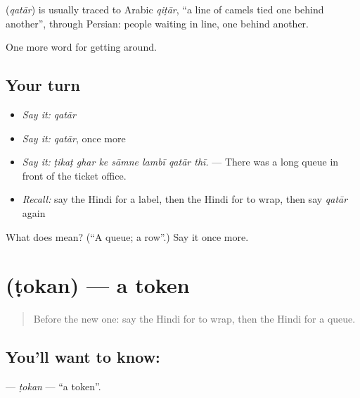 \begin{cousinweb}
\textbf{} (\emph{qatār}) is usually traced to Arabic \emph{qiṭār}, \textquotedblleft{}a line of camels tied one behind another\textquotedblright{}, through Persian: people waiting in line, one behind another.
\end{cousinweb}

\begin{grammarlens}[title={What you've built}]
One more word for getting around.
\end{grammarlens}

\subsection*{Your turn}
\begin{itemize}
\raggedright
  \item \emph{Say it:} \emph{qatār}
  \item \emph{Say it:} \emph{qatār}, once more
  \item \emph{Say it:} \emph{ṭikaṭ ghar ke sāmne lambī qatār thī.} — There was a long queue in front of the ticket office.
  \item \emph{Recall:} say the Hindi for a label, then the Hindi for to wrap, then say \emph{qatār} again
\end{itemize}

\begin{tcolorbox}[breakable,colback=teal!4,colframe=teal!35!black,title={Before you move on}]
What does  mean? (\textquotedblleft{}A queue; a row\textquotedblright{}.) Say it once more.
\end{tcolorbox}
\section[\texorpdfstring{\hi{टोकन} (ṭokan)}{टोकन (ṭokan)}]{ (ṭokan) — a token}

\label{lesson:HI-C433-tokan}



\begin{quote}
Before the new one: say the Hindi for to wrap, then the Hindi for a queue.
\end{quote}

\subsection*{You'll want to know: }
\textbf{} — \emph{ṭokan} — \textquotedblleft{}a token\textquotedblright{}.

